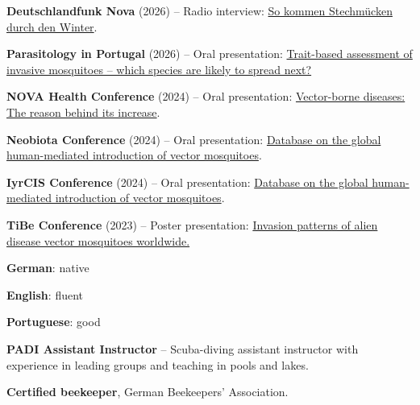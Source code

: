 \documentclass{simplecv}
\newcommand{\cvitemleft}[1]{%
  \noindent\makebox[1em][c]{\faAngleDoubleRight}%
  \parbox[t]{\dimexpr\linewidth-1em\relax}{#1}\par
  \smallskip
}
\begin{document}
\cvitemleft{\textbf{Deutschlandfunk Nova} (2026) -- Radio interview: \href{https://www.deutschlandfunknova.de/beitrag/insekten-so-kommen-stechmuecken-durch-den-winter}{So kommen Stechmücken durch den Winter}.}
\cvitemleft{\textbf{Parasitology in Portugal} (2026) -- Oral presentation: \href{https://miguelprudencio.com/wp-content/uploads/2026/03/ParasitologySimposyum26_AbstractBook.pdf}{Trait-based assessment of invasive mosquitoes -- which species are likely to spread next?}}
\cvitemleft{\textbf{NOVA Health Conference} (2024) -- Oral presentation: \href{https://novahealth.unl.pt/wp-content/uploads/2024/11/Abstract_Book.pdf}{Vector-borne diseases: The reason behind its increase}.}
\cvitemleft{\textbf{Neobiota Conference} (2024) -- Oral presentation: \href{https://dspace.uevora.pt/rdpc/bitstream/10174/37435/1/NEOBIOTA2024abstractBook.pdf}{Database on the global human-mediated introduction of vector mosquitoes}.}
\cvitemleft{\textbf{IyrCIS Conference} (2024) -- Oral presentation: \href{https://youtu.be/sYSzNgUhXgo?si=l7Sy_0bpp3cYIn9-}{Database on the global human-mediated introduction of vector mosquitoes}.}
\cvitemleft{\textbf{TiBe Conference} (2023) -- Poster presentation: \href{https://drive.google.com/file/d/1Sp1OJe7K_T-slImjc8w4OMFJR629cZ_P/view}{Invasion patterns of alien disease vector mosquitoes worldwide.}}

\cvitemleft{\textbf{German}: native}
\cvitemleft{\textbf{English}: fluent}
\cvitemleft{\textbf{Portuguese}: good}

\cvitemleft{\textbf{PADI Assistant Instructor} -- Scuba-diving assistant instructor with experience in leading groups and teaching in pools and lakes.}
\cvitemleft{\textbf{Certified beekeeper}, German Beekeepers' Association.}
\end{document}
